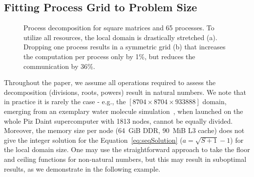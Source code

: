 \documentclass[sigplan,review,anonymous,10pt]{acmart}\settopmatter{printfolios=true,printccs=false,printacmref=false}
\begin{document}
\subsection{Fitting Process Grid to Problem Size}
\label{sec:decompArbitrary}
\begin{figure}[!tbp]
	\centering
	\hfill
	\caption{Process decomposition for square matrices and 65 
		processes. To utilize all resources, the local domain is 
		drastically stretched (a). Dropping one 
		process results in a symmetric grid (b) that 
		increases the computation per process only by 1\%, but reduces 
		the communication by 36\%.}
	\label{fig:decompProblem}
\end{figure}
Throughout the paper, we assume all operations required to 
assess the decomposition (divisions, roots, powers) result in natural 
numbers. We note that in practice it is rarely the case - e.g., the 
$[8704 \times 8704 \times 933888]$ domain, emerging from an exemplary 
water molecule simulation~\cite{joost}, when launched on the whole 
Piz Daint supercomputer with 1813 nodes, cannot be equally divided. 
Moreover, the memory size per 
node (64~GiB DDR, 90~MiB L3 cache) does not give the integer solution 
for the Equation~\ref{eq:seqSolution} ($a = \sqrt{S+1} -1$) for the 
local domain size. One may use the straightforward approach to take  
the floor and ceiling
functions for non-natural numbers, but this may result in suboptimal 
results, as we demonstrate in the following example.
\end{document}
